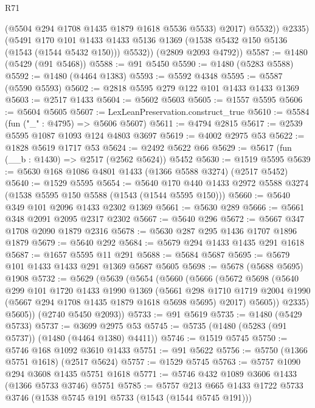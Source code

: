 \begin{lexlean}{R71}
\begin{coremodule}
                (@5504 @294 @1708 @1435 @1879 @1618 @5536 @5533)
                @2017)
              @5532))
          @2335)
        (@5491
          @170
          @101
          @1433
          @1433
          @5136
          @1369
          (@1538 @5432 @150 @5136 (@1543 (@1544 @5432 @150)))
          @5532))
      (@2809 @2093 @4792))
@5587 := @1480 (@5429 (@91 @5468))
@5588 := @91 @5450
@5590 := @1480 (@5283 @5588)
@5592 := @1480 (@4464 @1383)
@5593 := @5592 @4348
@5595 := @5587 (@5590 @5593)
@5602 := @2818 @5595 @279 @122 @101 @1433 @1433 @1369
@5603 := @2517 @1433
@5604 := @5602 @5603
@5605 := @1557 @5595
@5606 := @5604 @5605
@5607 := LexLeanPreservation.construct_true
@5610 := @5584 (fun ("_" : @4795) => @5606 @5607)
@5611 := @4794 @2815
@5617 := @2539 @5595 @1087 @1093 @124 @4803 @3697
@5619 := @4002 @2975 @53
@5622 := @1828 @5619 @1717 @53
@5624 := @2492 @5622 @66
@5629 := @5617 (fun (__b : @1430) => @2517 (@2562 @5624)) @5452
@5630 := @1519 @5595
@5639 := @5630 @168 @1086 @4801 @1433 (@1366 @5588 @3274) (@2517 @5452)
@5640 := @1529 @5595
@5654 := @5640 @170 @440 @1433 @2972 @5588 @3274 (@1538 @5595 @150 @5588 (@1543 (@1544 @5595 @150)))
@5660 := @5640 @349 @101 @2096 @1433 @2302 @1369
@5661 := @5630 @289
@5666 := @5661 @348 @2091 @2095 @2317 @2302
@5667 := @5640 @296
@5672 := @5667 @347 @1708 @2090 @1879 @2316
@5678 := @5630 @287 @295 @1436 @1707 @1896 @1879
@5679 := @5640 @292
@5684 := @5679 @294 @1433 @1435 @291 @1618
@5687 := @1657 @5595 @11 @291
@5688 := @5684 @5687
@5695 := @5679 @101 @1433 @1433 @291 @1369 @5687 @5605
@5698 := @5678 (@5688 @5695) @1908
@5732 := @5629
    (@5639
      (@5654
        (@5660
          (@5666
            (@5672
              @5698
              (@5640
                @299
                @101
                @1720
                @1433
                @1990
                @1369
                (@5661
                  @298
                  @1710
                  @1719
                  @2004
                  @1990
                  (@5667 @294 @1708 @1435 @1879 @1618 @5698 @5695)
                  @2017)
                @5605))
            @2335)
          @5605))
      (@2740 @5450 @2093))
@5733 := @91 @5619
@5735 := @1480 (@5429 @5733)
@5737 := @3699 @2975 @53
@5745 := @5735 (@1480 (@5283 (@91 @5737)) (@1480 (@4464 @1380) @4411))
@5746 := @1519 @5745
@5750 := @5746 @168 @1092 @3610 @1433
@5751 := @91 @5622
@5756 := @5750 (@1366 @5751 @1618) (@2517 @5624)
@5757 := @1529 @5745
@5763 := @5757 @1090 @294 @3608 @1435 @5751 @1618
@5771 := @5746 @432 @1089 @3606 @1433 (@1366 @5733 @3746) @5751
@5785 := @5757 @213 @665 @1433 @1722 @5733 @3746 (@1538 @5745 @191 @5733 (@1543 (@1544 @5745 @191)))

\end{coremodule}
\end{lexlean}
